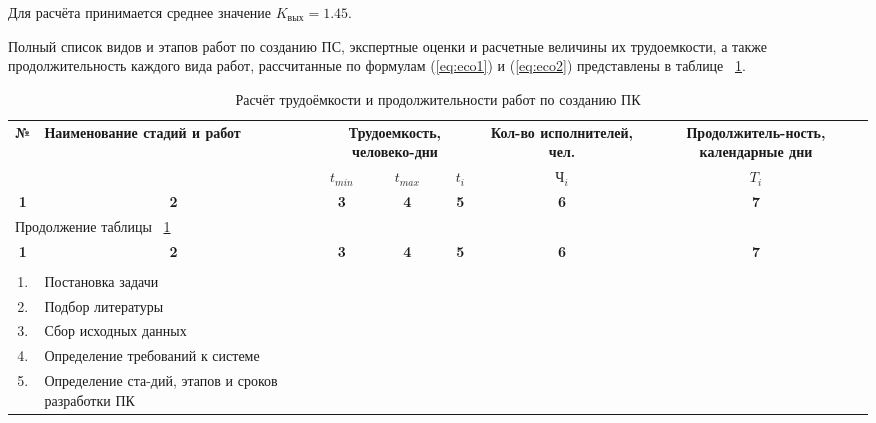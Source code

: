 Для расчёта принимается среднее значение ${K_{\mbox{вых}} = 1.45}$. 

Полный список видов и этапов работ по созданию ПС, экспертные оценки и расчетные величины их трудоемкости,
а также продолжительность каждого вида работ, рассчитанные по формулам (\ref{eq:eco1}) и (\ref{eq:eco2}) представлены
в таблице ~\ref{tab:eco2}.

\begin{center}
\begin{longtable}{|c|p{3.5cm}|c|c|c|c|c|}
\caption{Расчёт трудоёмкости и продолжительности работ по созданию ПК} \label{tab:eco2} \\ \hline
\multicolumn{1}{|c|}{\textbf{№}} & \multicolumn{1}{p{3.5cm}|}{\textbf{Наименование стадий и  работ}} & 
\multicolumn{3}{p{3.5cm}|}{\textbf{Трудоемкость, человеко-дни}} &   \multicolumn{1}{p{3cm}|}{\textbf{Кол-во исполнителей, чел.}} &
\multicolumn{1}{p{3.8cm}|}{\textbf{Продолжитель-ность, календарные дни}} \\
\cline{3-7}

\multicolumn{1}{|c|}{} &   \multicolumn{1}{c|}{} & 
\multicolumn{1}{|c|}{${t_{min}}$} & \multicolumn{1}{c|}{${t_{max}}$} & 
\multicolumn{1}{|c|}{ ${t_i}$ } &   \multicolumn{1}{c|}{ ${\mbox{Ч}_i}$ } & 
\multicolumn{1}{c|}{ ${T_i}$ } \\ \hline

\multicolumn{1}{|c|}{\textbf{1}} &   \multicolumn{1}{c|}{\textbf{2}} & 
\multicolumn{1}{|c|}{\textbf{3}} &   \multicolumn{1}{c|}{\textbf{4}} & 
\multicolumn{1}{|c|}{\textbf{5}} &   \multicolumn{1}{c|}{\textbf{6}} & 
\multicolumn{1}{c|}{\textbf{7}} \\ \hline
\endfirsthead

\multicolumn{7}{|l|}{{Продолжение таблицы ~\ref{tab:eco2}}} \\ %
\hline
\multicolumn{1}{|c|}{\textbf{1}} &   \multicolumn{1}{c|}{\textbf{2}} & 
\multicolumn{1}{c|}{\textbf{3}} & \multicolumn{1}{c|}{\textbf{4}} & 
\multicolumn{1}{|c|}{\textbf{5}} &   \multicolumn{1}{c|}{\textbf{6}} & 
\multicolumn{1}{c|}{\textbf{7}} \\ \hline
\endhead

\endfoot

\hline
\endlastfoot

\multicolumn{7}{|c|}{\textbf{Техническое задание}} \\ \hline

1. & Постановка задачи & & & & &\\ \hline
2. & Подбор литературы & & & & &\\ \hline
3. & Сбор исходных данных & & & & &\\ \hline
4. & Определение требований к системе & & & & &
	\\ \hline
5. & Определение ста-дий, этапов и сроков разработки ПК
	& & & & & \\ \hline


\end{longtable}
\end{center}
